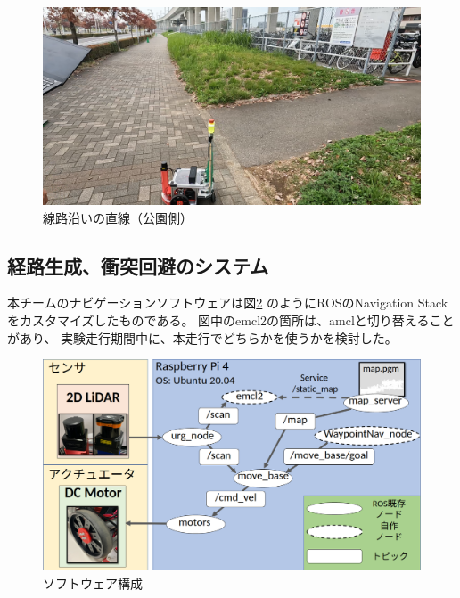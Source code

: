 \documentclass[twocolumn,9pt]{jsproceedings}
\begin{document}
\begin{figure}[h]
  \begin{center}
    \includegraphics[width=1.0\linewidth]{figs/park_side_alley.pdf}
	  \caption{線路沿いの直線（公園側）}
    \label{fig:park_side_alley}
  \end{center}
\end{figure}

\subsection{経路生成、衝突回避のシステム}

本チームのナビゲーションソフトウェアは図\ref{fig:software}
のようにROSのNavigation Stackをカスタマイズしたものである。
図中のemcl2の箇所は、amclと切り替えることがあり、
実験走行期間中に、本走行でどちらかを使うかを検討した。

\begin{figure}[h]
  \begin{center}
    \includegraphics[width=1.0\linewidth]{figs/software.pdf}
    \caption{ソフトウェア構成}
    \label{fig:software}
  \end{center}
\end{figure}
\end{document}
